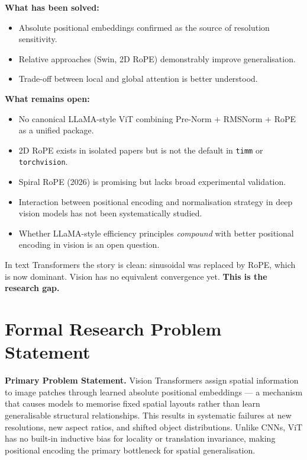 \documentclass[12pt,a4paper]{article}
\begin{document}
\textbf{What has been solved:}
\begin{itemize}[leftmargin=1.4em]
  \item Absolute positional embeddings confirmed as the source of resolution
        sensitivity.
  \item Relative approaches (Swin, 2D RoPE) demonstrably improve
        generalisation.
  \item Trade-off between local and global attention is better understood.
\end{itemize}

\textbf{What remains open:}
\begin{itemize}[leftmargin=1.4em]
  \item No canonical LLaMA-style ViT combining Pre-Norm + RMSNorm + RoPE as a
        unified package.
  \item 2D RoPE exists in isolated papers but is not the default in
        \texttt{timm} or \texttt{torchvision}.
  \item Spiral RoPE (2026) is promising but lacks broad experimental
        validation.
  \item Interaction between positional encoding and normalisation strategy in
        deep vision models has not been systematically studied.
  \item Whether LLaMA-style efficiency principles \emph{compound} with better
        positional encoding in vision is an open question.
\end{itemize}

In text Transformers the story is clean: sinusoidal was replaced by RoPE,
which is now dominant. Vision has no equivalent convergence yet.
\textbf{This is the research gap.}

\section{Formal Research Problem Statement}
\label{sec:statement}

\begin{callout}
  \textbf{Primary Problem Statement.} Vision Transformers assign spatial
  information to image patches through learned absolute positional embeddings
  --- a mechanism that causes models to memorise fixed spatial layouts rather
  than learn generalisable structural relationships. This results in systematic
  failures at new resolutions, new aspect ratios, and shifted object
  distributions. Unlike CNNs, ViT has no built-in inductive bias for locality
  or translation invariance, making positional encoding the primary bottleneck
  for spatial generalisation.
\end{callout}
\end{document}
